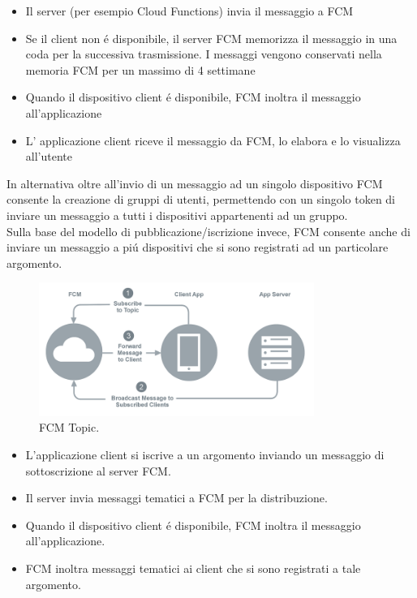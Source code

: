 \begin{itemize}
    \item Il server (per esempio Cloud Functions) invia il messaggio a FCM
    \item Se il client non \'e disponibile, il server FCM memorizza il messaggio in una coda per la successiva trasmissione. I messaggi vengono conservati nella memoria FCM per un massimo di 4 settimane
    \item Quando il dispositivo client \'e disponibile, FCM inoltra il messaggio all'applicazione
    \item L' applicazione client riceve il messaggio da FCM, lo elabora e lo visualizza all'utente
\end{itemize}


In alternativa oltre all'invio di un messaggio ad un singolo dispositivo FCM consente la creazione di gruppi di utenti, permettendo con un singolo token di inviare un messaggio a tutti i dispositivi appartenenti ad un gruppo.\\

Sulla base del modello di pubblicazione/iscrizione invece, FCM consente anche di inviare un messaggio a pi\'u dispositivi che si sono registrati ad un particolare argomento.

\begin{figure}[!hb]
  \centering
  \includegraphics[width=0.8\textwidth]{immagini/fcm_topic.png}
  \caption{FCM Topic.}\label{fig:FCM Topic}
\end{figure}


    \begin{itemize}
        \item L'applicazione client si iscrive a un argomento inviando un messaggio di sottoscrizione al server FCM.
        \item Il server invia messaggi tematici a FCM per la distribuzione.
        \item Quando il dispositivo client \'e disponibile, FCM inoltra il messaggio all'applicazione.
        \item FCM inoltra messaggi tematici ai client che si sono registrati a tale argomento.

    \end{itemize}




